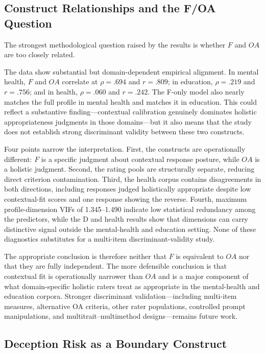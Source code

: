 \documentclass[manuscript,review,anonymous]{acmart}
\begin{document}
\subsection{Construct Relationships and the F/OA Question}

The strongest methodological question raised by the results is whether $F$ and $OA$ are too closely related.

The data show substantial but domain-dependent empirical alignment. In mental health, $F$ and $OA$ correlate at $\rho=.694$ and $r=.809$; in education, $\rho=.219$ and $r=.756$; and in health, $\rho=.060$ and $r=.242$. The F-only model also nearly matches the full profile in mental health and matches it in education. This could reflect a substantive finding---contextual calibration genuinely dominates holistic appropriateness judgments in those domains---but it also means that the study does not establish strong discriminant validity between these two constructs.

Four points narrow the interpretation. First, the constructs are operationally different: $F$ is a specific judgment about contextual response posture, while $OA$ is a holistic judgment. Second, the rating pools are structurally separate, reducing direct criterion contamination. Third, the health corpus contains disagreements in both directions, including responses judged holistically appropriate despite low contextual-fit scores and one response showing the reverse. Fourth, maximum profile-dimension VIFs of 1.345--1.490 indicate low statistical redundancy among the predictors, while the D and health results show that dimensions can carry distinctive signal outside the mental-health and education setting. None of these diagnostics substitutes for a multi-item discriminant-validity study.

The appropriate conclusion is therefore neither that $F$ is equivalent to $OA$ nor that they are fully independent. The more defensible conclusion is that contextual fit is operationally narrower than $OA$ and is a major component of what domain-specific holistic raters treat as appropriate in the mental-health and education corpora. Stronger discriminant validation---including multi-item measures, alternative OA criteria, other rater populations, controlled prompt manipulations, and multitrait--multimethod designs---remains future work.

\subsection{Deception Risk as a Boundary Construct}
\end{document}
